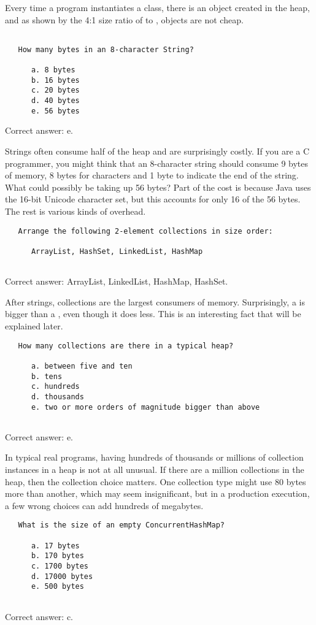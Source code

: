 Every time
a program instantiates a class, there is an object created in the heap, and as
shown by the 4:1 size ratio of  to , objects are not
cheap.
\begin{verbatim}
   
   How many bytes in an 8-character String?

      a. 8 bytes
      b. 16 bytes
      c. 20 bytes
      d. 40 bytes
      e. 56 bytes

\end{verbatim}
Correct answer: e.

Strings often consume half of the heap and are
surprisingly costly. If you are a C programmer, you might think that an 8-character string should 
consume 9 bytes
of memory, 8 bytes for characters and 1 byte to indicate the end of the string.
What could possibly be taking up 56 bytes? Part of the cost is because Java uses
the 16-bit Unicode character set, but this accounts for only 16 of the 56 bytes.
The rest is various kinds of overhead.
\begin{verbatim}             
   Arrange the following 2-element collections in size order:
    
      ArrayList, HashSet, LinkedList, HashMap
      
\end{verbatim}
Correct answer: ArrayList, LinkedList, HashMap, HashSet.
  
After strings,
collections are the largest consumers of memory. Surprisingly, a
 is bigger than a , even though it does less.
This is an interesting fact that will be explained later.
\begin{verbatim}      
   How many collections are there in a typical heap?
   
      a. between five and ten
      b. tens
      c. hundreds
      d. thousands
      e. two or more orders of magnitude bigger than above
      
\end{verbatim}
Correct answer: e.
 
In typical real programs, having hundreds of thousands or millions of collection
instances in a heap is not at all unusual. If there are a million collections in
the heap, then the collection choice matters. One collection type might use 80
bytes more than another, which may seem insignificant, but in a production
execution, a few wrong choices can add hundreds of megabytes.
\begin{verbatim}
   What is the size of an empty ConcurrentHashMap?
   
      a. 17 bytes
      b. 170 bytes
      c. 1700 bytes
      d. 17000 bytes
      e. 500 bytes
                 
\end{verbatim}
Correct answer: c.
 
